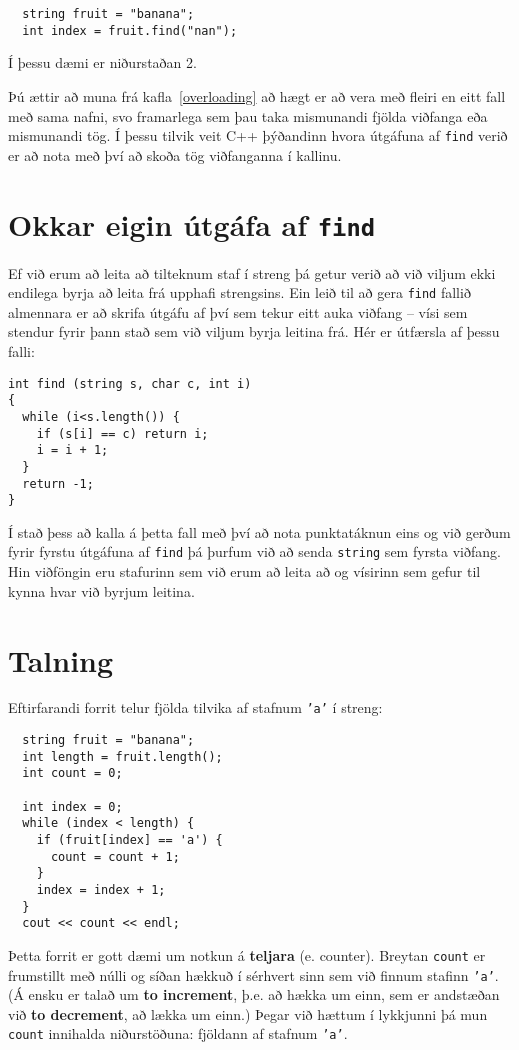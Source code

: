 \begin{verbatim}
  string fruit = "banana";
  int index = fruit.find("nan");
\end{verbatim}
%
Í þessu dæmi er niðurstaðan 2.

Þú ættir að muna frá kafla~\ref{overloading} að hægt er að vera með fleiri en eitt fall með sama nafni,
svo framarlega sem þau taka mismunandi fjölda viðfanga eða mismunandi tög.
Í þessu tilvik veit C++ þýðandinn hvora útgáfuna af {\tt find} verið er að nota með því að skoða tög viðfanganna í kallinu.

\section{Okkar eigin útgáfa af {\tt find}}

Ef við erum að leita að tilteknum staf í streng þá getur verið að við viljum ekki endilega byrja að leita frá upphafi strengsins. 
Ein leið til að gera {\tt find} fallið almennara er að skrifa útgáfu af því sem tekur eitt auka viðfang -- vísi sem stendur fyrir þann stað sem við viljum byrja leitina frá.
Hér er útfærsla af þessu falli:

\begin{verbatim}
int find (string s, char c, int i)
{
  while (i<s.length()) {
    if (s[i] == c) return i;
    i = i + 1;
  }
  return -1;
}
\end{verbatim}
%
Í stað þess að kalla á þetta fall með því að nota punktatáknun eins og við gerðum fyrir fyrstu útgáfuna af {\tt find}
þá þurfum við að senda {\tt string} sem fyrsta viðfang.
Hin viðföngin eru stafurinn sem við erum að leita að og vísirinn sem gefur til kynna hvar við byrjum leitina.

\section{Talning}
\label{loopcount}

Eftirfarandi forrit telur fjölda tilvika af stafnum {\tt 'a'} í streng:

\begin{verbatim}
  string fruit = "banana";
  int length = fruit.length();
  int count = 0;

  int index = 0;
  while (index < length) {
    if (fruit[index] == 'a') {
      count = count + 1;
    }
    index = index + 1;
  }
  cout << count << endl;
\end{verbatim}
%
Þetta forrit er gott dæmi um notkun á {\bf teljara} (e. counter).
Breytan {\tt count} er frumstillt með núlli og síðan hækkuð í sérhvert sinn sem við finnum stafinn {\tt 'a'}.
(Á ensku er talað um {\bf to increment}, þ.e. að hækka um einn, sem er andstæðan við {\bf to decrement}, að lækka um einn.)
Þegar við hættum í lykkjunni þá mun {\tt count} innihalda niðurstöðuna: fjöldann af stafnum {\tt 'a'}.

